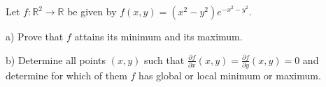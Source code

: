 Let $f\colon \mathbb R ^2 \rightarrow \mathbb R$ be given by $f(x,y)=(x^2-y^2)e^{-x^2-y^2}$.

a) Prove that $f$ attains its minimum and its maximum.

b) Determine all points $(x,y)$ such that $\frac{\partial f}{\partial x}(x,y)=\frac{\partial f}{\partial y}(x,y)=0$ and determine for which of them $f$ has global or local minimum or maximum.